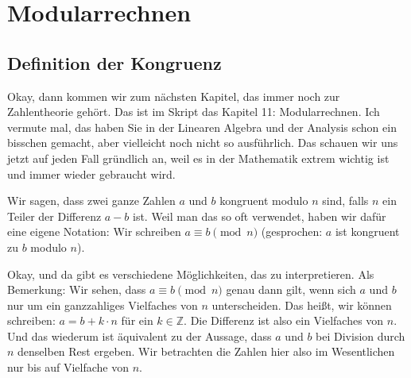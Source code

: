 \section{Modularrechnen}
\subsection{Definition der Kongruenz}

\begin{spoken-clean}[01:16:40 - 01:18:25]
Okay, dann kommen wir zum nächsten Kapitel, das immer noch zur Zahlentheorie gehört. Das ist im Skript das Kapitel 11: Modularrechnen. Ich vermute mal, das haben Sie in der Linearen Algebra und der Analysis schon ein bisschen gemacht, aber vielleicht noch nicht so ausführlich. Das schauen wir uns jetzt auf jeden Fall gründlich an, weil es in der Mathematik extrem wichtig ist und immer wieder gebraucht wird.

Wir sagen, dass zwei ganze Zahlen $a$ und $b$ kongruent modulo $n$ sind, falls $n$ ein Teiler der Differenz $a - b$ ist. Weil man das so oft verwendet, haben wir dafür eine eigene Notation: Wir schreiben $a \equiv b \pmod n$ (gesprochen: $a$ ist kongruent zu $b$ modulo $n$).

Okay, und da gibt es verschiedene Möglichkeiten, das zu interpretieren. Als Bemerkung: Wir sehen, dass $a \equiv b \pmod n$ genau dann gilt, wenn sich $a$ und $b$ nur um ein ganzzahliges Vielfaches von $n$ unterscheiden. Das heißt, wir können schreiben: $a = b + k \cdot n$ für ein $k \in \mathbb{Z}$. Die Differenz ist also ein Vielfaches von $n$. Und das wiederum ist äquivalent zu der Aussage, dass $a$ und $b$ bei Division durch $n$ denselben Rest ergeben. Wir betrachten die Zahlen hier also im Wesentlichen nur bis auf Vielfache von $n$.
\end{spoken-clean}

\begin{math-stroke}

\end{math-stroke}

